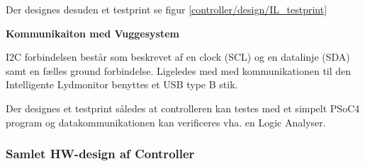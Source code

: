  
Der designes desuden et testprint se figur  \ref{controller/design/IL_testprint}


\textbf{Kommunikaiton med Vuggesystem}

I2C forbindelsen består som beskrevet af en clock (SCL) og en datalinje (SDA) samt en fælles ground forbindelse. Ligeledes med med kommunikationen til den Intelligente Lydmonitor benyttes et USB type B stik.


Der designes et testprint således at controlleren kan testes med et simpelt PSoC4 program og datakommunikationen kan verificeres vha. en Logic Analyser.


\subsubsection*{Samlet HW-design af Controller}

